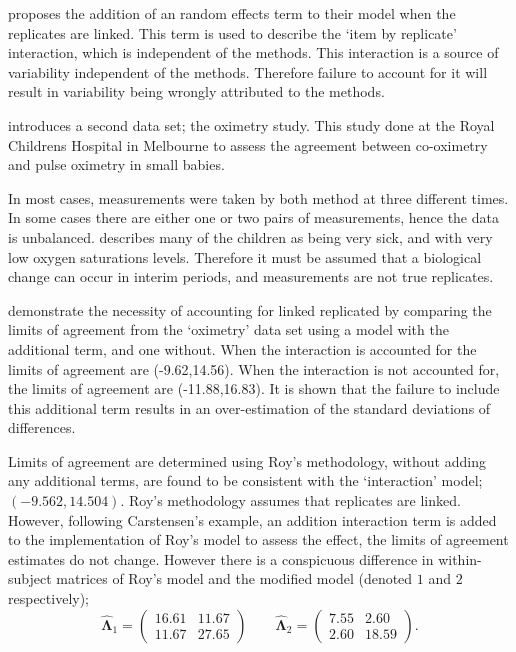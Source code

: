 \documentclass[12pt, a4paper]{article}
\theoremstyle{plain}
\theoremstyle{definition}
\theoremstyle{remark}
\begin{document}
\citet{BXC2008} proposes the addition of an random effects term to their model when the replicates are linked. This term is used to describe the `item by replicate' interaction, which is independent of the methods. This interaction is a source of variability independent of the methods. Therefore failure to account for it will result in variability being wrongly attributed to the methods.

\citet{BXC2008} introduces a second data set; the oximetry study. This study done at the Royal Childrens Hospital in
Melbourne to assess the agreement between co-oximetry and pulse oximetry in small babies.

In most cases, measurements were taken by both method at three different times. In some cases there are either one or two pairs of measurements, hence the data is unbalanced. \citet{BXC2008} describes many of the children as being very sick, and with very low oxygen saturations levels. Therefore it must be assumed that a biological change can occur in interim periods, and measurements are not true replicates.

\citet{BXC2008} demonstrate the necessity of accounting for linked replicated by comparing the limits of agreement from the `oximetry' data set using a model with the additional term, and one without. When the interaction is accounted for the limits of agreement are (-9.62,14.56). When the interaction is not accounted for, the limits of agreement are (-11.88,16.83). It is shown that the failure to include this additional term results in an over-estimation of the standard deviations of differences.

Limits of agreement are determined using Roy's methodology, without adding any additional terms, are found to be consistent with the `interaction' model; $(-9.562, 14.504 )$. Roy's methodology assumes that replicates are linked. However, following Carstensen's example, an addition interaction term is added to the implementation of Roy's model to assess the effect, the limits of agreement estimates do not change. However there is a conspicuous difference in within-subject matrices of Roy's model and the modified model (denoted $1$ and $2$ respectively);
\begin{equation}
\hat{\boldsymbol{\Lambda}}_{1}= \left(\begin{array}{cc}
 16.61 &	11.67\\
11.67 & 27.65 \end{array}\right) \qquad
\boldsymbol{\hat{\Lambda}}_{2}= \left( \begin{array}{cc}
    7.55 & 2.60 \\
    2.60 & 18.59 \end{array} \right).
\end{equation}
\end{document}
